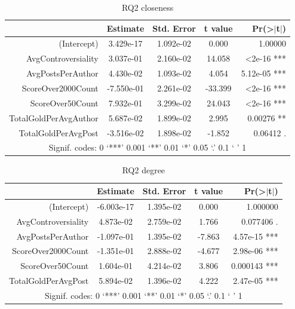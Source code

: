 \documentclass[bsc,frontabs,twoside,singlespacing,parskip,deptreport]{infthesis}
\begin{document}
\begin{table}[]
\centering
\caption{RQ2 closeness}
\label{tab:rq2-closeness}
\begin{tabular}{rcccr}
\hline
                      & Estimate   & Std. Error & t value & Pr(\textgreater{}$\rvert$t$\rvert$) \\ \hline
(Intercept)           & 3.429e-17  & 1.092e-02  & 0.000   & 1.00000                             \\
AvgControversiality   & 3.037e-01  & 2.160e-02  & 14.058  & \textless 2e-16 ***                 \\
AvgPostsPerAuthor     & 4.430e-02  & 1.093e-02  & 4.054   & 5.12e-05 ***                        \\
ScoreOver2000Count    & -7.550e-01 & 2.261e-02  & -33.399 & \textless 2e-16 ***                 \\
ScoreOver50Count      & 7.932e-01  & 3.299e-02  & 24.043  & \textless 2e-16 ***                 \\
TotalGoldPerAvgAuthor & 5.687e-02  & 1.899e-02  & 2.995   & 0.00276 **                          \\
TotalGoldPerAvgPost   & -3.516e-02 & 1.898e-02  & -1.852  & 0.06412 .                           \\ \hline
\multicolumn{5}{c}{Signif. codes:  0 ‘***’ 0.001 ‘**’ 0.01 ‘*’ 0.05 ‘.’ 0.1 ‘ ’ 1}              \\ \hline
\end{tabular}
\end{table}

\begin{table}[]
\centering
\caption{RQ2 degree}
\label{tab:rq2-degree}
\begin{tabular}{rcccr}
\hline
                    & Estimate   & Std. Error & t value & Pr(\textgreater{}$\rvert$t$\rvert$) \\ \hline
(Intercept)         & -6.003e-17 & 1.395e-02  & 0.000   & 1.000000                            \\
AvgControversiality & 4.873e-02  & 2.759e-02  & 1.766   & 0.077406 .                          \\
AvgPostsPerAuthor   & -1.097e-01 & 1.395e-02  & -7.863  & 4.57e-15 ***                        \\
ScoreOver2000Count  & -1.351e-01 & 2.888e-02  & -4.677  & 2.98e-06 ***                        \\
ScoreOver50Count    & 1.604e-01  & 4.214e-02  & 3.806   & 0.000143 ***                        \\
TotalGoldPerAvgPost & 5.894e-02  & 1.396e-02  & 4.222   & 2.47e-05 ***                        \\ \hline
\multicolumn{5}{c}{Signif. codes:  0 ‘***’ 0.001 ‘**’ 0.01 ‘*’ 0.05 ‘.’ 0.1 ‘ ’ 1}            \\ \hline
\end{tabular}
\end{table}
\end{document}
